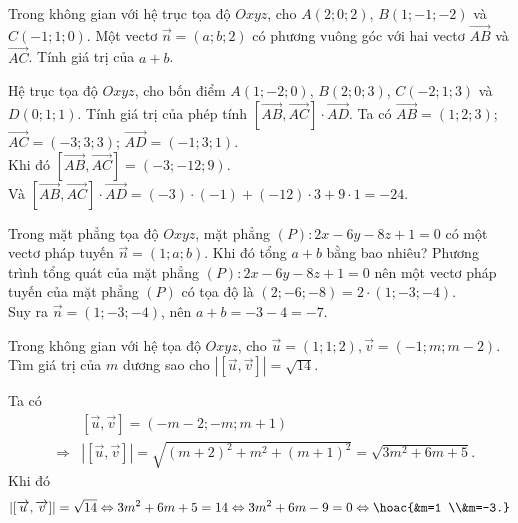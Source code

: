 \begin{ex}%
	Trong không gian với hệ trục tọa độ $Oxyz$, cho $A(2; 0; 2)$, $B(1;-1;-2)$ và $C(-1; 1; 0)$. Một vectơ $\overrightarrow{n}=(a; b; 2)$ có phương vuông góc với hai vectơ $\overrightarrow{AB}$ và $\overrightarrow{AC}$. Tính giá trị của $a+b$.
\end{ex}

\begin{ex}%
	Hệ trục tọa độ $Oxyz$, cho bốn điểm $A(1;-2; 0)$, $B(2; 0; 3)$, $C(-2; 1; 3)$ và $D(0; 1; 1)$. Tính giá trị của phép tính $\left[\overrightarrow{AB}, \overrightarrow{AC}\right] \cdot \overrightarrow{AD}$.
	\loigiai
	{
		Ta có $\overrightarrow{AB}=(1; 2; 3)$; $\overrightarrow{AC}=(-3; 3; 3)$; $\overrightarrow{A D}=(-1; 3; 1)$.\\
		Khi đó $\left[\overrightarrow{A B}, \overrightarrow{A C}\right]=(-3;-12; 9)$.\\
		Và $\left[\overrightarrow{A B}, \overrightarrow{A C}\right] \cdot \overrightarrow{A D}=(-3) \cdot(-1)+(-12) \cdot 3+9 \cdot 1=-24$.
	}
\end{ex}
\begin{ex}%
	Trong mặt phẳng tọa độ $O x y z$, mặt phẳng $(P)\colon 2 x-6 y-8 z+1=0$ có một vectơ pháp tuyến $\vec{n}=(1;a;b)$. Khi đó tổng $a+b$ bằng bao nhiêu? 
	\loigiai
	{
		Phương trình tổng quát của mặt phẳng $(P)\colon 2 x-6 y-8 z+1=0$ nên một vectơ pháp tuyến của mặt phẳng $(P)$ có tọa độ là $(2;-6;-8)=2\cdot (1;-3;-4)$.\\
		Suy ra $\vec{n}=(1;-3;-4)$, nên $a+b=-3-4=-7$.	
	}
\end{ex}

\begin{ex}%
	Trong không gian với hệ tọa độ $O x y z$, cho $\overrightarrow{u}=(1; 1; 2), \overrightarrow{v}=(-1; m; m-2)$. Tìm giá trị của $m$ dương sao cho $|[\overrightarrow{u}, \overrightarrow{v}]|=\sqrt{14}$.
	\loigiai
	{ Ta có {\allowdisplaybreaks
			\begin{eqnarray*}
				&& [\overrightarrow{u}, \overrightarrow{v}]=(-m-2;-m; m+1)\\ &\Rightarrow& |[\overrightarrow{u}, \overrightarrow{v}]|=\sqrt{(m+2)^2+m^2+(m+1)^2}=\sqrt{3 m^2+6 m+5}.
		\end{eqnarray*}}
		Khi đó $$|[\overrightarrow{u}, \overrightarrow{v}]|=\sqrt{14} \Leftrightarrow 3 m^2+6 m+5=14 \Leftrightarrow 3 m^2+6 m-9=0 \Leftrightarrow \hoac{&m=1 \\&m=-3.}$$
		
	}
\end{ex}


